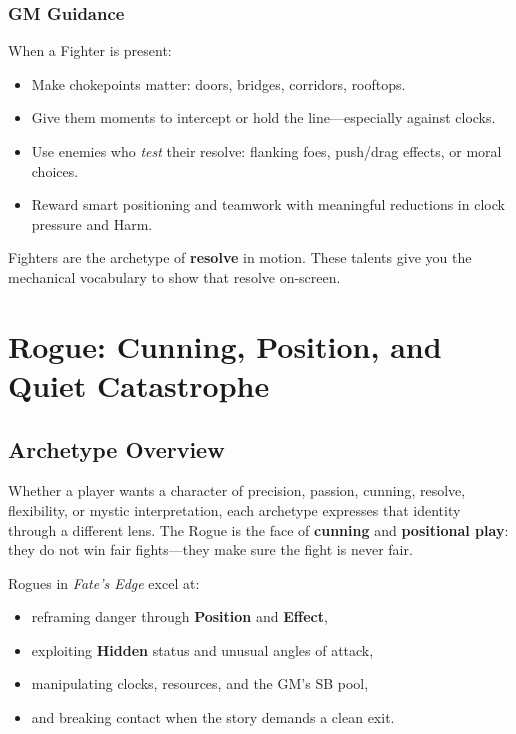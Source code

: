 \documentclass[11pt]{book}
\begin{document}
\subsection{GM Guidance}

When a Fighter is present:
\begin{itemize}
  \item Make chokepoints matter: doors, bridges, corridors, rooftops.
  \item Give them moments to intercept or hold the line---especially against clocks.
  \item Use enemies who \emph{test} their resolve:
        flanking foes, push/drag effects, or moral choices.
  \item Reward smart positioning and teamwork with meaningful reductions in
        clock pressure and Harm.
\end{itemize}

Fighters are the archetype of \textbf{resolve} in motion.  
These talents give you the mechanical vocabulary to show that resolve on-screen.


\chapter{Rogue: Cunning, Position, and Quiet Catastrophe}

\section{Archetype Overview}

Whether a player wants a character of precision, passion, cunning, resolve, flexibility, or
mystic interpretation, each archetype expresses that identity through a different lens.
The Rogue is the face of \textbf{cunning} and \textbf{positional play}:
they do not win fair fights---they make sure the fight is never fair.

Rogues in \textit{Fate's Edge} excel at:
\begin{itemize}
  \item reframing danger through \textbf{Position} and \textbf{Effect},
  \item exploiting \textbf{Hidden} status and unusual angles of attack,
  \item manipulating clocks, resources, and the GM's SB pool,
  \item and breaking contact when the story demands a clean exit.
\end{itemize}
\end{document}
